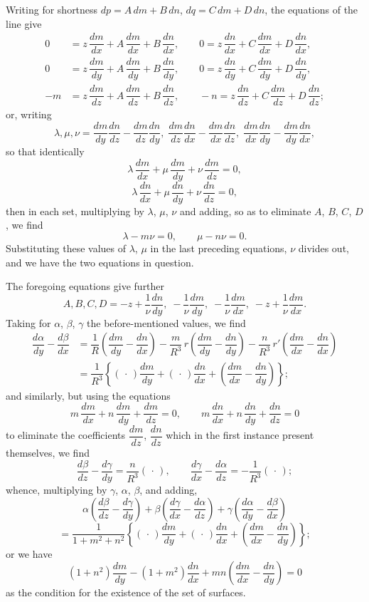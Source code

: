\documentclass[11pt]{article}
\begin{document}
Writing for shortness $dp = A\,dm + B\,dn$, $dq = C\,dm + D\,dn$, the equations of the line give
\begin{align*}
0 &= z\,\dfrac{dm}{dx} + A\,\dfrac{dm}{dx} + B\,\dfrac{dn}{dx},\qquad 0 = z\,\dfrac{dn}{dx} + C\,\dfrac{dm}{dx} + D\,\dfrac{dn}{dx},\\
0 &= z\,\dfrac{dm}{dy} + A\,\dfrac{dm}{dy} + B\,\dfrac{dn}{dy},\qquad 0 = z\,\dfrac{dn}{dy} + C\,\dfrac{dm}{dy} + D\,\dfrac{dn}{dy},\\
-m &= z\,\dfrac{dm}{dz} + A\,\dfrac{dm}{dz} + B\,\dfrac{dn}{dz},\qquad -n = z\,\dfrac{dn}{dz} + C\,\dfrac{dm}{dz} + D\,\dfrac{dn}{dz};
\end{align*}
or, writing
\[
\lambda, \mu, \nu = \dfrac{dm}{dy}\dfrac{dn}{dz} - \dfrac{dm}{dz}\dfrac{dn}{dy},\;\dfrac{dm}{dz}\dfrac{dn}{dx} - \dfrac{dm}{dx}\dfrac{dn}{dz},\;\dfrac{dm}{dx}\dfrac{dn}{dy} - \dfrac{dm}{dy}\dfrac{dn}{dx},
\]
so that identically
\[
\lambda\,\dfrac{dm}{dx} + \mu\,\dfrac{dm}{dy} + \nu\,\dfrac{dm}{dz} = 0,
\]
\[
\lambda\,\dfrac{dn}{dx} + \mu\,\dfrac{dn}{dy} + \nu\,\dfrac{dn}{dz} = 0,
\]
then in each set, multiplying by $\lambda$, $\mu$, $\nu$ and adding, so as to eliminate $A$, $B$, $C$, $D$, we find
\[
\lambda - m\nu = 0,\qquad \mu - n\nu = 0.
\]
Substituting these values of $\lambda$, $\mu$ in the last preceding equations, $\nu$ divides out, and we have the two equations in question.

The foregoing equations give further
\[
A, B, C, D = -z + \dfrac{1}{\nu}\dfrac{dn}{dy},\;-\dfrac{1}{\nu}\dfrac{dm}{dy},\;-\dfrac{1}{\nu}\dfrac{dm}{dx},\;-z + \dfrac{1}{\nu}\dfrac{dm}{dx}.
\]
Taking for $\alpha$, $\beta$, $\gamma$ the before-mentioned values, we find
\begin{align*}
\dfrac{d\alpha}{dy} - \dfrac{d\beta}{dx} &= \dfrac{1}{R}\!\left(\dfrac{dm}{dy} - \dfrac{dn}{dx}\right) - \dfrac{m}{R^3}\,r\!\left(\dfrac{dm}{dy} - \dfrac{dn}{dy}\right) - \dfrac{n}{R^3}\,r'\!\left(\dfrac{dm}{dx} - \dfrac{dn}{dx}\right)\\
&= \dfrac{1}{R^3}\!\left\{\!\left(\,\cdot\,\right)\dfrac{dm}{dy} + (\,\cdot\,)\dfrac{dn}{dx} + \!\left(\dfrac{dm}{dx} - \dfrac{dn}{dy}\right)\!\right\};
\end{align*}
and similarly, but using the equations
\[
m\,\dfrac{dm}{dx} + n\,\dfrac{dm}{dy} + \dfrac{dm}{dz} = 0,\qquad m\,\dfrac{dn}{dx} + n\,\dfrac{dn}{dy} + \dfrac{dn}{dz} = 0
\]
to eliminate the coefficients $\dfrac{dm}{dz}$, $\dfrac{dn}{dz}$ which in the first instance present themselves, we find
\[
\dfrac{d\beta}{dz} - \dfrac{d\gamma}{dy} = \dfrac{n}{R^3}\!\left(\,\cdot\,\right),\qquad \dfrac{d\gamma}{dx} - \dfrac{d\alpha}{dz} = -\dfrac{1}{R^3}\!\left(\,\cdot\,\right);
\]
whence, multiplying by $\gamma$, $\alpha$, $\beta$, and adding,
\[
\alpha\!\left(\dfrac{d\beta}{dz} - \dfrac{d\gamma}{dy}\right) + \beta\!\left(\dfrac{d\gamma}{dx} - \dfrac{d\alpha}{dz}\right) + \gamma\!\left(\dfrac{d\alpha}{dy} - \dfrac{d\beta}{dx}\right)
\]
\[
= \dfrac{1}{1 + m^2 + n^2}\!\left\{(\,\cdot\,)\dfrac{dm}{dy} + (\,\cdot\,)\dfrac{dn}{dx} + \!\left(\dfrac{dm}{dx} - \dfrac{dn}{dy}\right)\!\right\};
\]
or we have
\[
(1 + n^2)\dfrac{dm}{dy} - (1 + m^2)\dfrac{dn}{dx} + mn\!\left(\dfrac{dm}{dx} - \dfrac{dn}{dy}\right) = 0
\]
as the condition for the existence of the set of surfaces.
\end{document}
